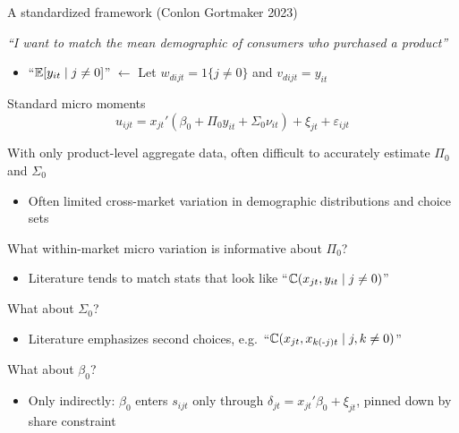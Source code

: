 \begin{frame}[label=framework]{A standardized framework (Conlon Gortmaker 2023)}
\begin{wideitemize}
        \item \textit{``I want to match the mean demographic of consumers who purchased a product''}
        \begin{itemize}
            \item ``$\mathbb{E}[y_{it} \mid j \neq 0]$'' $\leftarrow$ Let $w_{dijt} = 1\{j \neq 0\}$ and $v_{dijt} = y_{it}$
        \end{itemize}
    \end{wideitemize}
\end{frame}



\begin{frame}[label=standard]{Standard micro moments}
    \begin{equation*}
        u_{ijt} = x_{jt}'(\beta_0 + \Pi_0 y_{it} + \Sigma_0 \nu_{it}) + \xi_{jt} + \varepsilon_{ijt}
    \end{equation*}
    
    \begin{wideitemize}
        \item With only product-level aggregate data, often difficult to accurately estimate $\Pi_0$ and $\Sigma_0$
        \begin{itemize}
            \item Often limited \alert{cross-market variation} in demographic distributions and choice sets
        \end{itemize}
        
        \item What \alert{within-market} micro variation is informative about $\Pi_0$?
        \begin{itemize}
            \item Literature tends to match stats that look like ``$\mathbb{C}(x_{jt}, y_{it} \mid j \neq 0)$''
        \end{itemize}
        
        \item What about $\Sigma_0$?
        \begin{itemize}
            \item Literature emphasizes \alert{second choices}, e.g.\ ``$\mathbb{C}(x_{jt}, x_{k(\text{-}j)t} \mid j, k \neq 0)$''
        \end{itemize}
        
        \item What about $\beta_0$?
        \begin{itemize}
            \item Only \alert{indirectly}: $\beta_0$ enters $s_{ijt}$ only through $\delta_{jt} = x_{jt}'\beta_0 + \xi_{jt}$, pinned down by share constraint
        \end{itemize}
    \end{wideitemize}
\end{frame}


